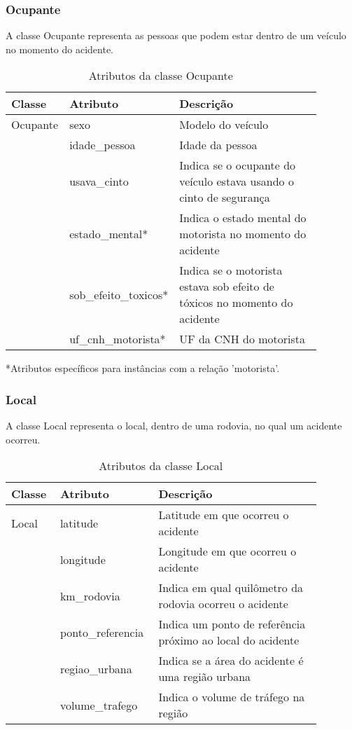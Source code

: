 
\subsubsection*{\textbf{Ocupante}}

  A classe Ocupante representa as pessoas que podem estar dentro de um veículo no momento do acidente.
  
    \begin{table*}[!h]
    \centering
    \begin{tabular}{p{0.15\linewidth}p{0.23\linewidth}p{0.5\linewidth}}
      \hline
      \textbf{Classe} & \textbf{Atributo} & \textbf{Descrição}\\
      \hline
	Ocupante & sexo & Modelo do veículo\\
		 & idade\_pessoa & Idade da pessoa\\
		 & usava\_cinto & Indica se o ocupante do veículo estava usando o cinto de segurança\\
		 & estado\_mental* & Indica o estado mental do motorista no momento do acidente\\
		 & sob\_efeito\_toxicos* & Indica se o motorista estava sob efeito de tóxicos no momento do acidente\\
		 & uf\_cnh\_motorista* & UF da CNH do motorista\\
      \hline
    \end{tabular}
    *Atributos específicos para instâncias com a relação 'motorista'.

    \caption{Atributos da classe Ocupante}
    \label{tab:attr_ocupante}
    \end{table*}
    
\subsubsection*{\textbf{Local}}

  A classe Local representa o local, dentro de uma rodovia, no qual um acidente ocorreu.
  
    \begin{table*}[!h]
    \centering
    \begin{tabular}{p{0.15\linewidth}p{0.23\linewidth}p{0.5\linewidth}}
      \hline
      \textbf{Classe} & \textbf{Atributo} & \textbf{Descrição}\\
      \hline
	Local & latitude & Latitude em que ocorreu o acidente\\
	      & longitude & Longitude em que ocorreu o acidente\\
	      & km\_rodovia & Indica em qual quilômetro da rodovia ocorreu o acidente\\
	      & ponto\_referencia & Indica um ponto de referência próximo ao local do acidente\\
	      & regiao\_urbana & Indica se a área do acidente é uma região urbana\\
	      & volume\_trafego & Indica o volume de tráfego na região\\
      \hline
    \end{tabular}
    \caption{Atributos da classe Local}
    \label{tab:attr_local}
    \end{table*}

